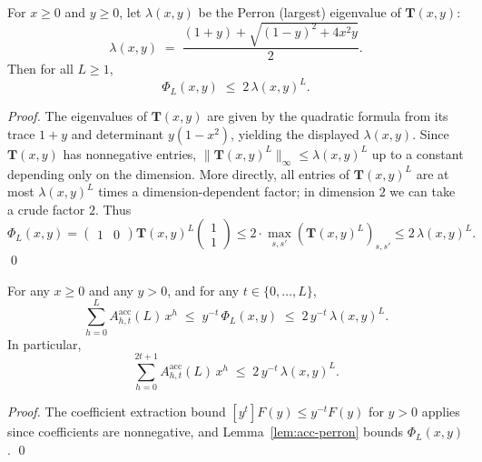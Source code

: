 \begin{lemma}
\label{lem:acc-perron}
For $x\ge 0$ and $y\ge 0$, let $\lambda(x,y)$ be the Perron (largest) eigenvalue of $\mathbf T(x,y)$:
\[
\lambda(x,y)
\;=\;
\frac{(1+y) + \sqrt{(1-y)^2 + 4x^2y}}{2}.
\]
Then for all $L\ge 1$,
\[
\Phi_L(x,y)\;\le\; 2\,\lambda(x,y)^{L}.
\]
\end{lemma}

\begin{proof}
The eigenvalues of $\mathbf T(x,y)$ are given by the quadratic formula from its trace $1+y$ and determinant
$y(1-x^2)$, yielding the displayed $\lambda(x,y)$.
Since $\mathbf T(x,y)$ has nonnegative entries, $\|\mathbf T(x,y)^L\|_{\infty}\le \lambda(x,y)^L$ up to a constant
depending only on the dimension.
More directly, all entries of $\mathbf T(x,y)^L$ are at most $\lambda(x,y)^L$ times a dimension-dependent factor;
in dimension $2$ we can take a crude factor $2$.
Thus
\[
\Phi_L(x,y)
=
\begin{pmatrix}1&0\end{pmatrix}
\mathbf T(x,y)^{L}
\begin{pmatrix}1\\1\end{pmatrix}
\le
2\cdot \max_{s,s'} (\mathbf T(x,y)^L)_{s,s'}
\le
2\,\lambda(x,y)^L.
\]
\qed
\end{proof}

\begin{corollary}
\label{cor:acc-coeff-bound}
For any $x\ge 0$ and any $y>0$, and for any $t\in\{0,\dots,L\}$,
\[
\sum_{h=0}^{L} A^{\mathrm{acc}}_{h,t}(L)\,x^{h}
\;\le\;
y^{-t}\,\Phi_L(x,y)
\;\le\;
2\,y^{-t}\,\lambda(x,y)^L.
\]
In particular,
\[
\sum_{h=0}^{2t+1} A^{\mathrm{acc}}_{h,t}(L)\,x^{h}
\;\le\;
2\,y^{-t}\,\lambda(x,y)^L.
\]
\end{corollary}

\begin{proof}
The coefficient extraction bound $[y^t]F(y)\le y^{-t}F(y)$ for $y>0$ applies since coefficients are nonnegative, and
Lemma~\ref{lem:acc-perron} bounds $\Phi_L(x,y)$.
\qed
\end{proof}



